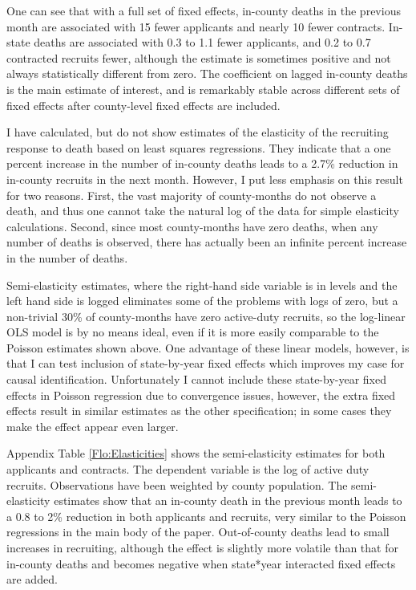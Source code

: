 \documentclass[12pt] {article}
\begin{document}
One can see that with a full set of fixed effects, in-county deaths in the previous month are associated with 15 fewer applicants and nearly 10 fewer contracts. In-state deaths
are associated with 0.3 to 1.1 fewer applicants, and 0.2 to 0.7 contracted
recruits fewer, although the estimate is sometimes positive and not
always statistically different from zero. The coefficient on lagged
in-county deaths is the main estimate of interest, and is remarkably
stable across different sets of fixed effects after county-level fixed
effects are included.

I have calculated, but do not show estimates of the elasticity of
the recruiting response to death based on least squares regressions.
They indicate that a one percent increase in the number of in-county
deaths leads to a 2.7\% reduction in in-county recruits in the next
month. However, I put less emphasis on this result for two reasons.
First, the vast majority of county-months do not observe a death,
and thus one cannot take the natural log of the data for simple elasticity
calculations. Second, since most county-months have zero deaths, when
any number of deaths is observed, there has actually been an infinite
percent increase in the number of deaths. 

Semi-elasticity estimates, where the right-hand side variable is in levels and the left hand side is logged eliminates some of the problems with logs of zero, but a non-trivial 30\% of county-months have zero active-duty recruits, so the log-linear OLS model is by no means ideal, even if it is more easily comparable to the Poisson estimates shown above.  One advantage of these linear models, however, is that I can test inclusion of state-by-year fixed effects which improves my case for causal identification. Unfortunately I cannot include these state-by-year fixed effects in Poisson regression due to convergence issues, however, the extra fixed effects result in similar estimates as the other specification; in some cases they make the effect appear even larger. 

Appendix Table \ref{Flo:Elasticities} shows the semi-elasticity estimates for both applicants and contracts. The dependent variable is the log of active duty recruits. Observations have been weighted by county population. The semi-elasticity estimates show that an in-county death
in the previous month leads to a 0.8 to 2\% reduction in both applicants and recruits, very similar to the Poisson regressions in the main body of the paper. Out-of-county deaths lead to small increases in recruiting, although the effect is slightly more volatile than that for in-county deaths and becomes negative when state{*}year interacted fixed effects are added. 
\end{document}
